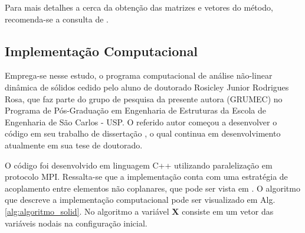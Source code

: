 Para mais detalhes a cerca da obtenção das matrizes e vetores do método, recomenda-se a consulta de .

\subsection{Implementação Computacional}

Emprega-se nesse estudo, o programa computacional de análise não-linear dinâmica de sólidos cedido pelo aluno de doutorado Rosicley Junior Rodrigues Rosa, que faz parte do grupo de pesquisa da presente autora (GRUMEC) no Programa de Pós-Graduação em Engenharia de Estruturas da Escola de Engenharia de São Carlos - USP. O referido autor começou a desenvolver o código em seu trabalho de dissertação \cite{Rosa:2021}, o qual continua em desenvolvimento atualmente em sua tese de doutorado.

O código foi desenvolvido em linguagem C++ utilizando paralelização em protocolo MPI. Ressalta-se que a implementação conta com uma estratégia de acoplamento entre elementos não coplanares, que pode ser vista em . O algoritmo que descreve a implementação computacional pode ser visualizado em Alg. \ref{alg:algoritmo_solid}. No algoritmo a variável $\mathbf{X}$ consiste em um vetor das variáveis nodais na configuração inicial.

